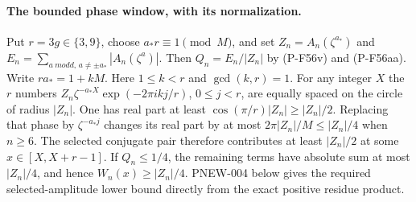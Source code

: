\paragraph{The bounded phase window, with its normalization.}
Put $r=3g\in\{3,9\}$, choose $a_*r\equiv1\pmod M$, and set
$Z_n=A_n(\zeta^{a_*})$ and
$E_n=\sum_{a\ {
m odd},\,a\ne\pm a_*}|A_n(\zeta^a)|$.
Then $Q_n=E_n/|Z_n|$ by (P-F56v) and (P-F56aa).
Write $ra_*=1+kM$.  Here $1\le k<r$ and $\gcd(k,r)=1$.
For any integer $X$ the $r$ numbers
$Z_n\zeta^{-a_*X}\exp(-2\pi i k j/r)$, $0\le j<r$,
are equally spaced on the circle of radius $|Z_n|$.
One has real part at least $\cos(\pi/r)|Z_n|\ge |Z_n|/2$.
Replacing that phase by $\zeta^{-a_*j}$ changes its real part
by at most $2\pi|Z_n|/M\le |Z_n|/4$ when $n\ge6$.
The selected conjugate pair therefore contributes at least
$|Z_n|/2$ at some $x\in[X,X+r-1]$.
If $Q_n\le1/4$, the remaining terms have absolute sum at most
$|Z_n|/4$, and hence $W_n(x)\ge |Z_n|/4$.
PNEW-004 below gives the required selected-amplitude lower bound
directly from the exact positive residue product.
